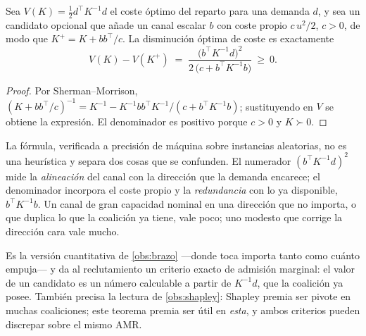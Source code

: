 \begin{teorema}
\label{th:actuador-adicional}
Sea $V(K)=\tfrac12 d^{\!\top}K^{-1}d$ el coste óptimo del reparto para una
demanda $d$, y sea un candidato opcional que añade un canal escalar $b$ con coste
propio $c\,u^{2}/2$, $c>0$, de modo que $K^{+}=K+bb^{\!\top}/c$. La disminución
óptima de coste es exactamente \cite{mayorga2026m1}
\[
  V(K)-V(K^{+})\;=\;\frac{\bigl(b^{\!\top}K^{-1}d\bigr)^{2}}
  {2\,\bigl(c+b^{\!\top}K^{-1}b\bigr)}\ \ge\ 0 .
\]
\end{teorema}

\begin{proof}
Por Sherman--Morrison,
$(K+bb^{\!\top}/c)^{-1}=K^{-1}-K^{-1}bb^{\!\top}K^{-1}/(c+b^{\!\top}K^{-1}b)$;
sustituyendo en $V$ se obtiene la expresión. El denominador es positivo porque
$c>0$ y $K\succ0$.
\end{proof}

\begin{observacion}
\label{obs:actuador-valor}
La fórmula, verificada a precisión de máquina sobre instancias aleatorias, no es
una heurística y separa dos cosas que se confunden. El numerador
$(b^{\!\top}K^{-1}d)^{2}$ mide la \emph{alineación} del canal con la dirección que
la demanda encarece; el denominador incorpora el coste propio y la
\emph{redundancia} con lo ya disponible, $b^{\!\top}K^{-1}b$. Un canal de gran
capacidad nominal en una dirección que no importa, o que duplica lo que la
coalición ya tiene, vale poco; uno modesto que corrige la dirección cara vale
mucho.

Es la versión cuantitativa de \cref{obs:brazo} —donde toca importa tanto como
cuánto empuja— y da al reclutamiento un criterio exacto de admisión marginal:
el valor de un candidato es un número calculable a partir de $K^{-1}d$, que la
coalición ya posee. También precisa la lectura de \cref{obs:shapley}: Shapley
premia ser pivote en muchas coaliciones; este teorema premia ser útil en
\emph{esta}, y ambos criterios pueden discrepar sobre el mismo AMR.
\end{observacion}

